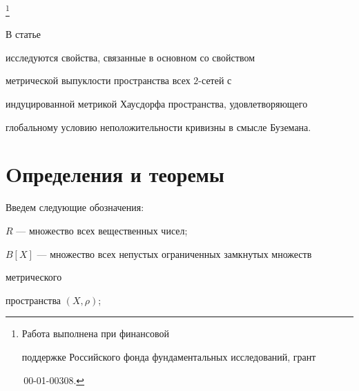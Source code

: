 \thanks{Работа выполнена при финансовой


поддержке Российского фонда фундаментальных исследований, грант


\No\,00-01-00308.}





\date{}




\pagestyle{plain} %







\maketitle


\label{begin}








В статье 


исследуются свойства, связанные в основном со свойством


метрической выпуклости пространства всех $2$-сетей с


индуцированной метрикой Хаусдорфа пространства, удовлетворяющего


глобальному условию неположительности кривизны в смысле Буземана.








\section{Oпределения и теоремы}





Введем следующие обозначения:





$R$ --- множество всех вещественных чисел;





$B[X]$ --- множество всех непустых ограниченных замкнутых множеств


метрического


пространства $(X,\rho)$;





